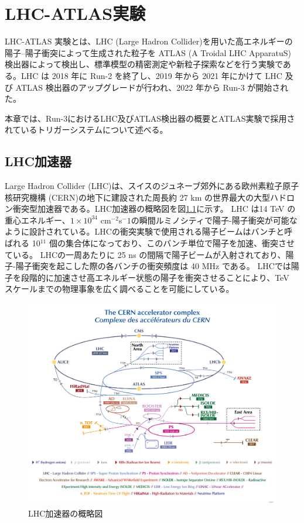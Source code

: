 \chapter{LHC-ATLAS実験}
\label{chapter2}

LHC-ATLAS 実験とは、LHC (Large Hadron Collider)を用いた高エネルギーの陽子–陽子衝突によって生成された粒子を ATLAS (A Troidal LHC ApparatuS) 検出器によって検出し、標準模型の精密測定や新粒子探索などを行う実験である。LHC は 2018 年に Run-2 を終了し、2019 年から 2021 年にかけて LHC 及び ATLAS 検出器のアップグレードが行われ、2022 年から Run-3 が開始された。

本章では、Run-3におけるLHC及びATLAS検出器の概要とATLAS実験で採用されているトリガーシステムについて述べる。

\section{LHC加速器}
\label{section2-1}

Large Hadron Collider (LHC)は、スイスのジュネーブ郊外にある欧州素粒子原子核研究機構 (CERN)の地下に建設された周長約 27 km の世界最大の大型ハドロン衝突型加速器である。LHC加速器の概略図を図\ref{fig:LHC加速器}に示す。
LHC は14 TeV の重心エネルギー、$1\times10^{34}$ cm$^{-2}$s${^-1}$の瞬間ルミノシティで陽子-陽子衝突が可能なように設計されている。LHCの衝突実験で使用される陽子ビームはバンチと呼ばれる 10${^11}$ 個の集合体になっており、このバンチ単位で陽子を加速、衝突させている。
LHCの一周あたりに 25 ns の間隔で陽子ビームが入射されており、陽子-陽子衝突を起こした際の各バンチの衝突頻度は 40 MHz である。
LHCでは陽子を段階的に加速させ高エネルギー状態の陽子を衝突させることにより、TeV スケールまでの物理事象を広く調べることを可能にしている。

\begin{figure}[tb]
  \centering
  \includegraphics[clip]{fig/2/accel_complex-v2022_complex.png}
  \caption{LHC加速器の概略図}
  \label{fig:LHC加速器}
\end{figure}



